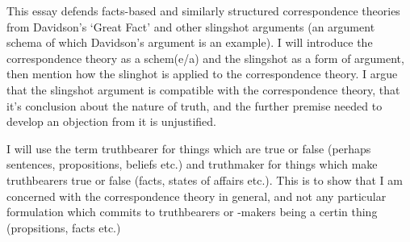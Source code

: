 This essay defends facts-based and similarly structured correspondence theories from Davidson's `Great Fact' and other slingshot arguments (an argument schema of which Davidson's argument is an example).
I will introduce the correspondence theory as a schem(e/a) and the slingshot as a form of argument, then mention how the slinghot is applied to the correspondence theory.
I argue that the slingshot argument is compatible with the correspondence theory, that it's conclusion about the nature of truth, and the further premise needed to develop an objection from it is unjustified.

I will use the term truthbearer for things which are true or false (perhaps sentences, propositions, beliefs etc.) and truthmaker for things which make truthbearers true or false (facts, states of affairs etc.).
This is to show that I am concerned with the correspondence theory in general, and not any particular formulation which commits to truthbearers or -makers being a certin thing (propsitions, facts etc.)
